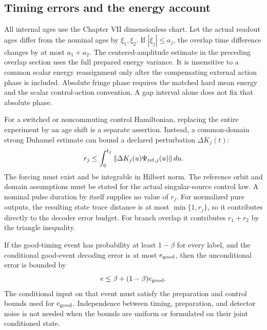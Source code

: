 \subsection{Timing errors and the energy account}
All internal ages use the Chapter VII dimensionless chart. Let the actual
readout ages differ from the nominal ages by $\xi_1,\xi_2$. If
$|\xi_j|\le a_j$, the overlap time difference changes by at most
$a_1+a_2$. The centered-amplitude estimate in the preceding overlap section
uses the full prepared energy variance. It is insensitive to a common
scalar energy reassignment only after the compensating external action
phase is included. Absolute fringe phase requires the matched hard mean
energy and the scalar control-action convention. A gap interval alone does
not fix that absolute phase.

For a switched or noncommuting control Hamiltonian, replacing the entire
experiment by an age shift is a separate assertion. Instead, a common-domain
strong Duhamel estimate can bound a declared perturbation $\Delta K_j(t)$:
\begin{equation}
 r_j\le\int_0^{t_f}
       \|\Delta K_j(u)\Psi_{{\rm ref},j}(u)\|\,du.
 \label{eq:foundation-control-forcing}
\end{equation}
The forcing must exist and be integrable in Hilbert norm. The reference
orbit and domain assumptions must be stated for the actual singular-source
control law. A nominal pulse duration by itself supplies no value of $r_j$.
For normalized pure outputs, the resulting state trace distance is at most
$\min\{1,r_j\}$, so it contributes directly to the decoder error budget.
For branch overlap it contributes $r_1+r_2$ by the triangle inequality.

If the good-timing event has probability at least $1-\beta$ for every label,
and the conditional good-event decoding error is at most $e_{\rm good}$,
then the unconditional error is bounded by
\begin{equation}
 e\le\beta+(1-\beta)e_{\rm good}.
 \label{eq:foundation-timing-tail}
\end{equation}
The conditional input on that event must satisfy the preparation and control
bounds used for $e_{\rm good}$. Independence between timing, preparation,
and detector noise is not needed when the bounds are uniform or formulated
on their joint conditioned state.

